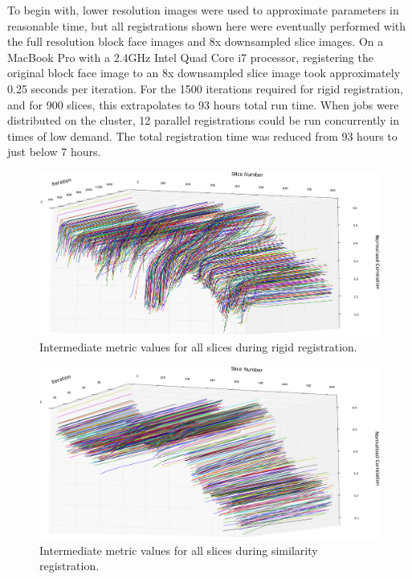   To begin with, lower resolution images were used to approximate parameters in reasonable time, but all registrations shown here were eventually performed with the full resolution block face images and 8x downsampled slice images. On a MacBook Pro with a 2.4GHz Intel Quad Core i7 processor, registering the original block face image to an 8x downsampled slice image took approximately 0.25 seconds per iteration. For the 1500 iterations required for rigid registration, and for 900 slices, this extrapolates to 93 hours total run time. When jobs were distributed on the cluster, 12 parallel registrations could be run concurrently in times of low demand. The total registration time was reduced from 93 hours to just below 7 hours.
	
  \begin{figure}
    \centering
    \includegraphics[width=\textheight]{Ch5/Figs/diagnostics/rigid_metric_values}
    \caption{Intermediate metric values for all slices during rigid registration.}
    \label{fig:rigid_metric_values}
  \end{figure}
      
  \begin{figure}
    \centering
    \includegraphics[width=\textheight]{Ch5/Figs/diagnostics/similarity_metric_values}
    \caption{Intermediate metric values for all slices during similarity registration.}
    \label{fig:similarity_metric_values}
  \end{figure}
      
